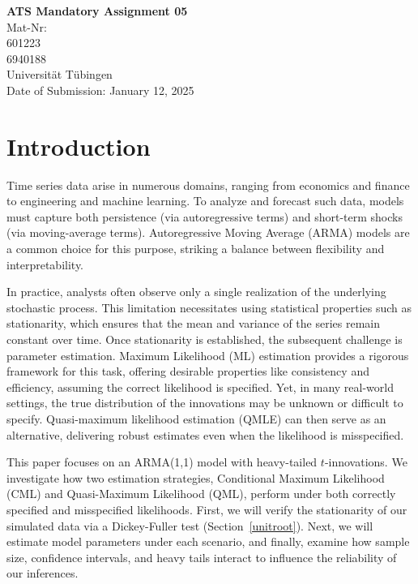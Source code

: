 \documentclass[a4paper,12pt]{article}
\begin{document}
\begin{titlepage}
    \centering
    \vspace*{2cm}
    
    {\Large \textbf{ATS Mandatory Assignment 05}}\\[1.5cm]
    
    {\large Mat-Nr: \\ 601223 \\ 6940188 \\[0.5cm]
    Universität Tübingen}\\[1cm]
    
    {\large Date of Submission: January 12, 2025}\\[1.5cm]
    
    \vfill
\end{titlepage}

\newpage
\tableofcontents
\newpage

\setcounter{page}{1}

\section{Introduction}
Time series data arise in numerous domains, ranging from economics and finance to engineering and machine learning. To analyze and forecast such data, models must capture both persistence (via autoregressive terms) and short-term shocks (via moving-average terms). Autoregressive Moving Average (ARMA) models are a common choice for this purpose, striking a balance between flexibility and interpretability.

In practice, analysts often observe only a single realization of the underlying stochastic process. This limitation necessitates using statistical properties such as stationarity, which ensures that the mean and variance of the series remain constant over time. Once stationarity is established, the subsequent challenge is parameter estimation. Maximum Likelihood (ML) estimation provides a rigorous framework for this task, offering desirable properties like consistency and efficiency, assuming the correct likelihood is specified. Yet, in many real-world settings, the true distribution of the innovations may be unknown or difficult to specify. Quasi-maximum likelihood estimation (QMLE) can then serve as an alternative, delivering robust estimates even when the likelihood is misspecified.

This paper focuses on an ARMA(1,1) model with heavy-tailed \(t\)-innovations. We investigate how two estimation strategies, Conditional Maximum Likelihood (CML) and Quasi-Maximum Likelihood (QML), perform under both correctly specified and misspecified likelihoods. First, we will verify the stationarity of our simulated data via a Dickey-Fuller test (Section~\ref{unitroot}). Next, we will estimate model parameters under each scenario, and finally, examine how sample size, confidence intervals, and heavy tails interact to influence the reliability of our inferences.
\end{document}
